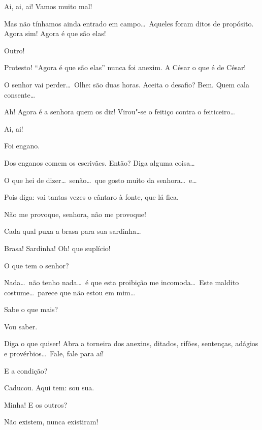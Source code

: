   Ai, ai, ai! Vamos muito mal!

  Mas não tínhamos ainda entrado em campo\ldots\ Aqueles foram
ditos de propósito. Agora sim! Agora é que são elas!

  Outro!

  Protesto! “Agora é que são elas” nunca foi anexim. A César o que
é de César!

  O senhor vai perder\ldots\ Olhe: são duas horas.  Aceita o desafio?  Bem. Quem
cala consente\ldots

  Ah! Agora é a senhora quem os diz! Virou"-se o feitiço contra o
feiticeiro\ldots

  Ai, ai!

  Foi engano.

  Dos enganos comem os escrivães.  Então?  Diga alguma
coisa\ldots

  O que hei de dizer\ldots\ senão\ldots\ que gosto muito da
senhora\ldots\ e\ldots

  Pois diga: vai tantas vezes o cântaro à fonte, que lá fica.

  Não me provoque, senhora, não me provoque!

  Cada qual puxa a brasa para sua sardinha\ldots

   Brasa! Sardinha! Oh! que suplício!

  O que tem o senhor?

  Nada\ldots\ não tenho nada\ldots\ é que esta proibição me
incomoda\ldots\ Este maldito costume\ldots\ parece que não estou em mim\ldots

  Sabe o que mais?

  Vou saber.

  Diga o que quiser! Abra a torneira dos anexins, ditados,
rifões, sentenças, adágios e provérbios\ldots\ Fale, fale para aí!

  E a condição?

  Caducou.  Aqui tem: sou sua.

   Minha!  E os outros?

  Não existem, nunca existiram!

